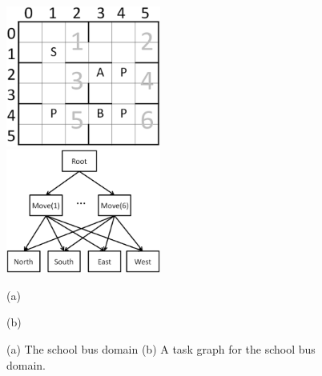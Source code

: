 \begin{figure}[t]
 \begin{minipage}[b]{0.5\linewidth}
    \begin{center}
    \includegraphics[width=2.0in] {./figures/BusSmall.eps}
\end{center}
\end{minipage}
\begin{minipage}[b]{0.5\linewidth}
    \begin{center}
    \includegraphics[width=2.0in] {./figures/BusHierarchy.eps}
\end{center}
\end{minipage}
\begin{minipage}[b]{0.5\linewidth} \centering (a) \end{minipage}
\begin{minipage}[b]{0.5\linewidth} \centering (b) \end{minipage}

\caption{(a) The school bus domain (b) A task graph for the school bus domain.}
\label{fig:bus}
\end{figure}


